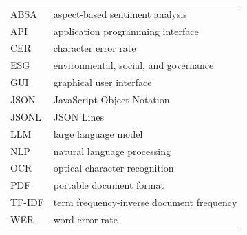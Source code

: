 \header{\headerabbreviations}
\setlongtables
\begin{longtable}[l]{p{3cm}p{}}

    ABSA & aspect-based sentiment analysis\\
    API & application programming interface\\
    CER & character error rate\\
    ESG & environmental, social, and governance\\
    GUI & graphical user interface \\
    JSON & JavaScript Object Notation \\
    JSONL & JSON Lines \\
    LLM & large language model \\
    NLP & natural language processing \\
    OCR & optical character recognition \\
    PDF & portable document format  \\    
    TF-IDF & term frequency-inverse document frequency \\
    WER & word error rate
\end{longtable}
\setcounter{table}{0}

